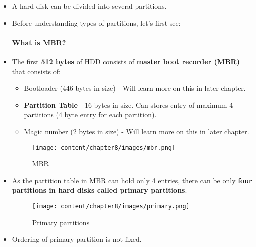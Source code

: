 \setlength{\columnsep}{3pt}
\begin{flushleft}
	
	\begin{itemize}
		\item A hard disk can be divided into several partitions. 
		\item Before understanding types of partitions, let's first see:
		\paragraph{What is MBR?}
			\item The first \textbf{512 bytes} of HDD consists of \textbf{master boot recorder (MBR)} that consists of:
			\begin{itemize}
				\item Bootloader (446 bytes in size) - Will learn more on this in later chapter.
				\item \textbf{Partition Table} - 16 bytes in size. Can stores entry of maximum 4 partitions (4 byte entry for each partition).
				\item Magic number (2 bytes in size) - Will learn more on this in later chapter.
			\end{itemize}
	
		\begin{figure}[h!]
			\centering
			\texttt{[image: content/chapter8/images/mbr.png]}
			\caption{MBR}
			\label{mbr_naming}
		\end{figure}		
		
		\newpage
		\item As the partition table in MBR can hold only 4 entries, there can be only \textbf{four partitions in hard disks called primary partitions}.
		\begin{figure}[h!]
			\centering
			\texttt{[image: content/chapter8/images/primary.png]}
			\caption{Primary partitions}
			\label{primary_naming}
		\end{figure}		
		\item Ordering of primary partition is not fixed.
		
	\end{itemize}
	
\end{flushleft}

\newpage


